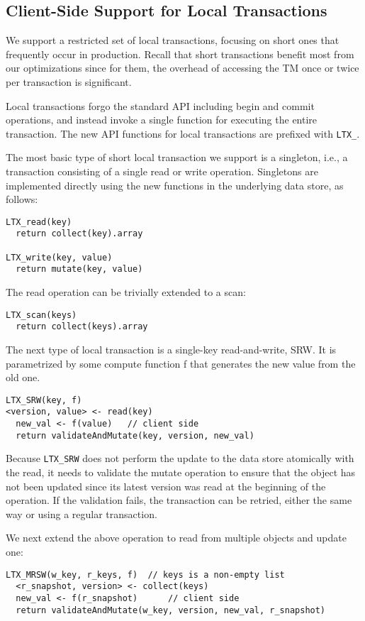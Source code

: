 \subsection{Client-Side Support for Local Transactions}
We support a restricted set of local transactions, focusing on short ones that
frequently occur in production. Recall that short transactions benefit most from
our optimizations since for them, the overhead of accessing the TM once or twice
per transaction is significant.

Local transactions forgo the standard API including begin and commit operations,
and instead invoke a single function for executing the entire transaction. The
new API functions for local transactions are prefixed with \verb|LTX_|.

The most basic type of short local transaction we support is a singleton, i.e.,
a transaction consisting of a single read or write operation. Singletons are
implemented directly using the new functions in the underlying data store, as
follows:

\begin{verbatim}
LTX_read(key) 
  return collect(key).array

LTX_write(key, value)
  return mutate(key, value)
\end{verbatim}
The read operation can be trivially extended to a scan:

\begin{verbatim}
LTX_scan(keys)
  return collect(keys).array
\end{verbatim}

The next type of local transaction is a single-key read-and-write, SRW. It is
parametrized by some compute function f that generates the new value from the
old one.
{\small
\begin{verbatim}
LTX_SRW(key, f)
<version, value> <- read(key)
  new_val <- f(value)	// client side
  return validateAndMutate(key, version, new_val) 
\end{verbatim}}

Because \verb|LTX_SRW| does not perform the update to the data store atomically
with the read, it needs to validate the mutate operation to ensure that the object
has not been updated since its latest version was read at the beginning of the
operation. If the validation fails, the transaction can be retried, either the
same way or using a regular transaction.

We next  extend the above operation to read from multiple objects and update one:
{\scriptsize
\begin{verbatim}
LTX_MRSW(w_key, r_keys, f)  // keys is a non-empty list 
  <r_snapshot, version> <- collect(keys)
  new_val <- f(r_snapshot)		// client side
  return validateAndMutate(w_key, version, new_val, r_snapshot)
\end{verbatim}}
